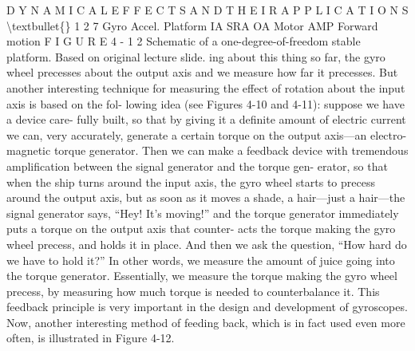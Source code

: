 \documentclass[10pt,oneside]{article}
\begin{document}
D Y N A M I C A L  E F F E C T S  A N D  T H E I R  A P P L I C A T I O N S \textbackslash{}textbullet\{\} 1 2 7 Gyro Accel. Platform IA SRA OA Motor AMP Forward motion F I G U R E  4 - 1 2 Schematic of a one-degree-of-freedom stable platform. Based on original lecture slide. ing about this thing so far, the gyro wheel precesses about the output axis and we measure how far it precesses. But another interesting technique for measuring the effect of rotation about the input axis is based on the fol- lowing idea (see Figures 4-10 and 4-11): suppose we have a device care- fully built, so that by giving it a definite amount of electric current we can, very accurately, generate a certain torque on the output axis---an electro- magnetic torque generator. Then we can make a feedback device with tremendous amplification between the signal generator and the torque gen- erator, so that when the ship turns around the input axis, the gyro wheel starts to precess around the output axis, but as soon as it moves a shade, a hair---just a hair---the signal generator says, “Hey! It’s moving!” and the torque generator immediately puts a torque on the output axis that counter- acts the torque making the gyro wheel precess, and holds it in place. And then we ask the question, “How hard do we have to hold it?” In other words, we measure the amount of juice going into the torque generator. Essentially, we measure the torque making the gyro wheel precess, by measuring how much torque is needed to counterbalance it. This feedback principle is very important in the design and development of gyroscopes. Now, another interesting method of feeding back, which is in fact used even more often, is illustrated in Figure 4-12.\par
\end{document}
